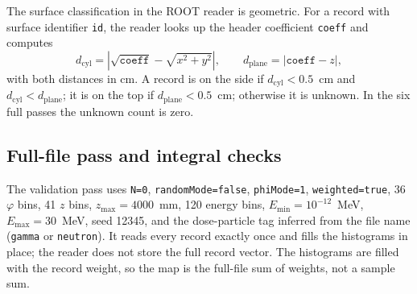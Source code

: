 \documentclass[11pt,a4paper]{article}
\begin{document}
The surface classification in the ROOT reader is geometric.  For a record with
surface identifier \texttt{id}, the reader looks up the header coefficient
\texttt{coeff} and computes
\[
  d_{\text{cyl}} = \left|\sqrt{\texttt{coeff}} - \sqrt{x^2+y^2}\right|,
  \qquad
  d_{\text{plane}} = \left|\texttt{coeff} - z\right|,
\]
with both distances in cm.  A record is on the side if
$d_{\text{cyl}}<0.5$~cm and $d_{\text{cyl}}<d_{\text{plane}}$; it is on the top
if $d_{\text{plane}}<0.5$~cm; otherwise it is unknown.  In the six full passes
the unknown count is zero.

\subsection{Full-file pass and integral checks}

The validation pass uses
\texttt{N=0}, \texttt{randomMode=false}, \texttt{phiMode=1},
\texttt{weighted=true}, 36 $\varphi$ bins, 41 $z$ bins, $z_{\max}=4000$~mm,
120 energy bins, $E_{\min}=10^{-12}$~MeV, $E_{\max}=30$~MeV, seed 12345, and
the dose-particle tag inferred from the file name (\texttt{gamma} or
\texttt{neutron}).
It reads every record exactly once and fills the histograms in place; the
reader does not store the full record vector.  The histograms are filled with
the record weight, so the map is the full-file sum of weights, not a sample
sum.
\end{document}
